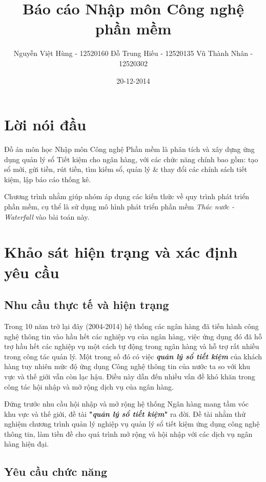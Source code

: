 \documentclass{article}
\title{Báo cáo Nhập môn Công nghệ phần mềm}
\date{20-12-2014}
\author{
	Nguyễn Việt Hùng - 12520160
	Đỗ Trung Hiếu - 12520135
	Vũ Thành Nhân - 12520302
}
\begin{document}
	\tableofcontents
	\newpage
	
	\section{Lời nói đầu}
	Đồ án môn học Nhập môn Công nghệ Phần mềm là phân tích và xây dựng ứng dụng quản lý sổ Tiết kiệm cho ngân hàng, với các chức năng chính bao gồm: tạo sổ mới, gửi tiền, rút tiền, tìm kiếm sổ, quản lý \& thay đổi các chính sách tiết kiệm, lập báo cáo thống kê.
	
	Chương trình nhằm giúp nhóm áp dụng các kiến thức về quy trình phát triển phần mềm, cụ thể là sử dụng mô hình phát triển phần mềm \textit{Thác nước - Waterfall} vào bài toán này.
	
	\section{Khảo sát hiện trạng và xác định yêu cầu}
	\subsection{Nhu cầu thực tế và hiện trạng}
	
	Trong 10 năm trở lại đây (2004-2014) hệ thống các ngân hàng đã tiến
	hành công nghệ thông tin vào hầu hết các nghiệp vụ của ngân hàng, việc ứng dụng đó đã hỗ trợ hầu hết các nghiệp vụ một cách tự động trong ngân hàng và hỗ trợ rất nhiều trong công tác quản lý. Một trong số đó có việc \emph{\textbf{quản lý sổ tiết kiệm}} của khách hàng tuy nhiên mức độ ứng dụng Công nghệ thông tin của nước ta so với khu vực và thế giới vẫn còn lạc hậu. Điều này dẫn đến nhiều vấn đề khó khăn trong công tác hội nhập và mở rộng dịch vụ của ngân hàng.
	
	Đứng trước nhu cầu hội nhập và mở rộng hệ thống Ngân hàng mang tầm vóc khu vực và thế giới, đề tài \textbf{"\textit{quản lý sổ tiết kiệm}"} ra đời. Đề tài nhằm thử nghiệm chương trình quản lý nghiệp vụ quản lý sổ tiết kiệm ứng dụng công nghệ thông tin, làm tiền đề cho quá trình mở rộng và hội nhập với các dịch vụ ngân hàng hiện đại.
	
	
	\subsection{Yêu cầu chức năng}
	
\end{document}
